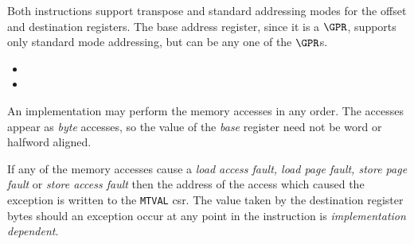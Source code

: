 Both instructions support transpose and standard addressing modes for the
offset and destination registers. The base address register, since it is
a $\GPR$, supports only standard mode addressing, but can be any one of the
$\GPR$s.

\begin{itemize}
\item {}
\item {}
\end{itemize}


An implementation may perform the memory accesses in any order. The accesses
appear as {\em byte} accesses, so the value of the {\em base} register
need not be word or halfword aligned.

If any of the memory accesses cause
a {\em load access fault, load page fault, store page fault} or
{\em store access fault} then the address of the access which caused the
exception is written to the {\tt MTVAL} csr. The value taken by the
destination register bytes should an exception occur at any point in the
instruction is {\em implementation dependent}.

